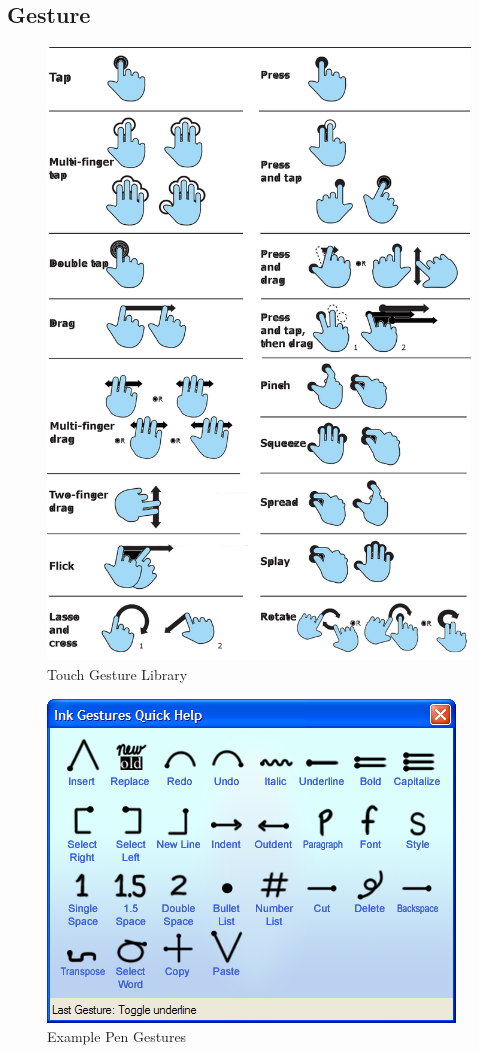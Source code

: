 \documentclass[12pt]{report}
\begin{document}
\subsection{Gesture}

\begin{figure}
\includegraphics[width=0.9\linewidth]{GestureLibrary}
\caption{Touch Gesture Library}
\end{figure}
\begin{figure}
\includegraphics[width=0.9\linewidth]{pengestures}
\caption{Example Pen Gestures}
\end{figure}
\end{document}
